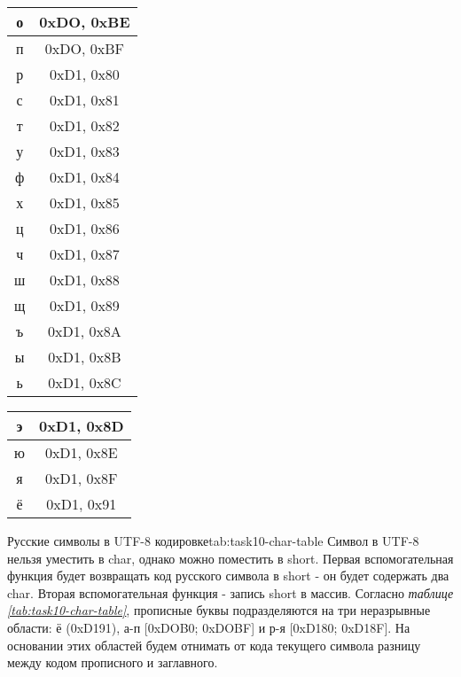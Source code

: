 \documentclass[a4paper, 12pt, oneside]{article}
\begin{document}
{\begin{tabular}{|c|c|}
            \hline
            о      & 0xDO, 0xBE \\
            \hline
            п      & 0xDO, 0xBF \\
            \hline
            р      & 0xD1, 0x80 \\
            \hline
            с      & 0xD1, 0x81 \\
            \hline
            т      & 0xD1, 0x82 \\
            \hline
            у      & 0xD1, 0x83 \\
            \hline
            ф      & 0xD1, 0x84 \\
            \hline
            х      & 0xD1, 0x85 \\
            \hline
            ц      & 0xD1, 0x86 \\
            \hline
            ч      & 0xD1, 0x87 \\
            \hline
            ш      & 0xD1, 0x88 \\
            \hline
            щ      & 0xD1, 0x89 \\
            \hline
            ъ      & 0xD1, 0x8A \\
            \hline
            ы      & 0xD1, 0x8B \\
            \hline
            ь      & 0xD1, 0x8C \\
            \hline
        \end{tabular}
        \begin{tabular}{|c|c|}
            \hline
            э & 0xD1, 0x8D \\
            \hline
            ю & 0xD1, 0x8E \\
            \hline
            я & 0xD1, 0x8F \\
            \hline
            ё & 0xD1, 0x91 \\
            \hline
        \end{tabular}
    }{Русские символы в UTF-8 кодировке}{tab:task10-char-table}
    Символ в UTF-8 нельзя уместить в char, однако можно поместить в short.
    Первая вспомогательная функция будет возвращать код русского символа в short - он будет содержать два char.
    Вторая вспомогательная функция - запись short в массив.
    Согласно \textit{таблице \ref{tab:task10-char-table}}, прописные буквы подразделяются на три неразрывные области: ё (0xD191), а-п [0xDOB0; 0xDOBF]
    и р-я [0xD180; 0xD18F].
    На основании этих областей будем отнимать от кода текущего символа разницу между кодом прописного и заглавного.
\end{document}

